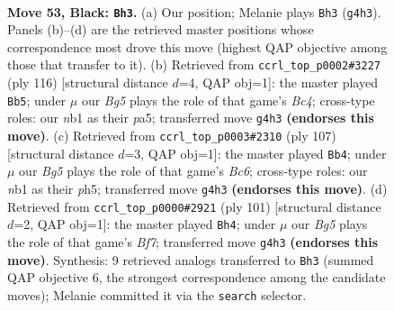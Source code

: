 \documentclass[11pt]{article}
\begin{document}
\clearpage

\begin{figure}[p]\centering
\begin{subfigure}{0.46\textwidth}\centering
\resizebox{\linewidth}{!}{%
\newchessgame
\chessboard[
  setfen={1B6/8/p4k2/8/2p3b1/8/5K2/1N6 b - - 5 53},
  showmover=false,
  pgfstyle=straightmove, color=movearrow, markmove={g4-h3}
]}
\caption{}
\end{subfigure}\hfill
\begin{subfigure}{0.46\textwidth}\centering
\resizebox{\linewidth}{!}{%
\newchessgame
\chessboard[
  setfen={8/8/5k2/p6K/P1B5/8/6P1/2b5 w - - 15 59},
  showmover=false,
  pgfstyle=straightmove, color=movearrow, markmove={c4-b5}
]}
\caption{}
\end{subfigure}
\\[4pt]
\begin{subfigure}{0.46\textwidth}\centering
\resizebox{\linewidth}{!}{%
\newchessgame
\chessboard[
  setfen={3k4/1B6/3p3p/7P/8/2b5/4K3/8 b - - 2 54},
  showmover=false,
  pgfstyle=straightmove, color=movearrow, markmove={c3-b4}
]}
\caption{}
\end{subfigure}\hfill
\begin{subfigure}{0.46\textwidth}\centering
\resizebox{\linewidth}{!}{%
\newchessgame
\chessboard[
  setfen={8/8/8/1B1k3p/5p2/8/5b1K/8 b - - 7 51},
  showmover=false,
  pgfstyle=straightmove, color=movearrow, markmove={f2-h4}
]}
\caption{}
\end{subfigure}
\caption{\textbf{Move 53, Black: \texttt{Bh3}.} (a) Our position; Melanie plays \texttt{Bh3} (\texttt{g4h3}). Panels (b)--(d) are the retrieved master positions whose correspondence most drove this move (highest QAP objective among those that transfer to it). (b) Retrieved from \texttt{ccrl\_top\_p0002\#3227} (ply 116) [structural distance $d$=4, QAP obj=1]: the master played \texttt{Bb5}; under $\mu$ our \emph{Bg5} plays the role of that game's \emph{Bc4}; cross-type roles: our \emph{n}b1 as their \emph{p}a5; transferred move \texttt{g4h3} \textbf{(endorses this move)}. (c) Retrieved from \texttt{ccrl\_top\_p0003\#2310} (ply 107) [structural distance $d$=3, QAP obj=1]: the master played \texttt{Bb4}; under $\mu$ our \emph{Bg5} plays the role of that game's \emph{Bc6}; cross-type roles: our \emph{n}b1 as their \emph{p}h5; transferred move \texttt{g4h3} \textbf{(endorses this move)}. (d) Retrieved from \texttt{ccrl\_top\_p0000\#2921} (ply 101) [structural distance $d$=2, QAP obj=1]: the master played \texttt{Bh4}; under $\mu$ our \emph{Bg5} plays the role of that game's \emph{Bf7}; transferred move \texttt{g4h3} \textbf{(endorses this move)}. Synthesis: 9 retrieved analogs transferred to \texttt{Bh3} (summed QAP objective 6, the strongest correspondence among the candidate moves); Melanie committed it via the \texttt{search} selector.}
\label{fig:thought-m105}
\end{figure}
\end{document}
